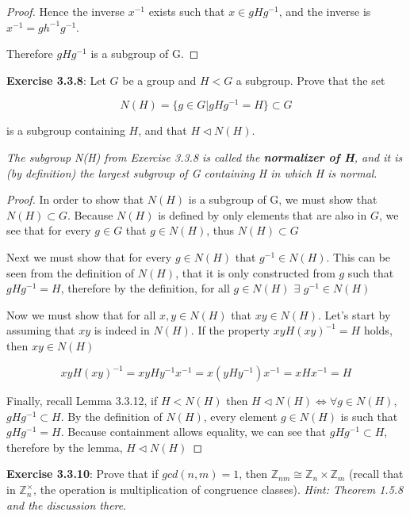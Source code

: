 \documentclass[a4paper]{article}
\begin{document}
\begin{myparindent}{0pt}
\begin{proof}
  Hence the inverse $x^{-1}$ exists such that $x \in gHg^{-1}$, and the inverse
  is $x^{-1} = gh^{-1}g^{-1}$.

  Therefore $gHg^{-1}$ is a subgroup of G.
\end{proof}

\textbf{Exercise 3.3.8}:
Let $G$ be a group and $H < G$ a subgroup. Prove that the set

\[ N(H) = \{g \in G | gHg^{-1} = H \} \subset G \]
\newline

is a subgroup containing $H$, and that $H \triangleleft N(H)$.

\textit{The subgroup N(H) from Exercise 3.3.8 is called the
\textbf{normalizer of H}, and it is (by definition) the largest subgroup of G
containing H in which H is normal}.
\newline

\begin{proof}
  In order to show that $N(H)$ is a subgroup of G, we must show that
  $N(H) \subset G$. Because $N(H)$ is defined by only elements that are also in
  $G$, we see that for every $g \in G$ that $g \in N(H)$, thus $N(H) \subset G$
  \newline

  Next we must show that for every $g \in N(H)$ that $g^{-1} \in N(H)$. This can
  be seen from the definition of $N(H)$, that it is only constructed from $g$
  such that $gHg^{-1} = H$, therefore by the definition, for all
  $g \in N(H)$ $\exists$ $g^{-1} \in N(H)$
  \newline

  Now we must show that for all $x, y \in N(H)$ that $xy \in N(H)$. Let's
  start by assuming that $xy$ is indeed in $N(H)$. If the property
  $x y H (x y)^{-1} = H$ holds, then $xy \in N(H)$

  \[ x y H (x y)^{-1} = xy H y^{-1} x^{-1} = x(y H y^{-1}) x^{-1} = x H x^{-1} = H \]

  Finally, recall Lemma 3.3.12, if $H < N(H)$ then
  $H \triangleleft N(H) \iff \forall g \in N(H)$, $gHg^{-1} \subset H$.
  By the definition of $N(H)$, every element $g \in N(H)$ is such that $gHg^{-1} = H$.
  Because containment allows equality, we can see that $gHg^{-1} \subset H$,
  therefore by the lemma, $H \triangleleft N(H)$
\end{proof}

\textbf{Exercise 3.3.10}:
Prove that if $gcd(n, m) = 1$, then
$\mathbb{Z}_{nm} \cong \mathbb{Z}_n \times \mathbb{Z}_m$
(recall that in $\mathbb{Z}_n^\times$, the operation is multiplication of
congruence classes). \textit{Hint: Theorem 1.5.8 and the discussion there}.
\newline


\end{myparindent}
\end{document}
